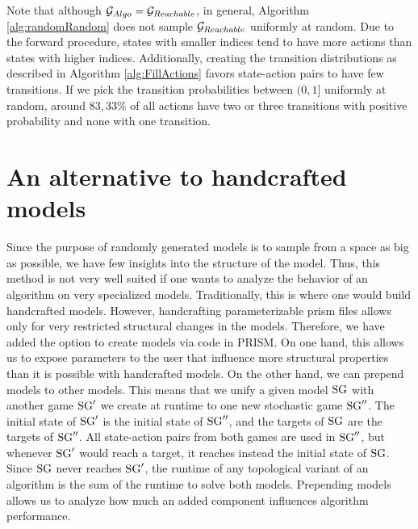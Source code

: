 Note that although $\mathcal{G}_{Algo} = \mathcal{G}_{Reachable}$, in general, Algorithm \ref{alg:randomRandom} does not sample $\mathcal{G}_{Reachable}$ uniformly at random.
Due to the forward procedure, states with smaller indices tend to have more actions than states with higher indices.
Additionally, creating the transition distributions as described in Algorithm \ref{alg:FillActions} favors state-action pairs to have few transitions.
If we pick the transition probabilities between $(0, 1]$ uniformly at random, around $83,33\%$ of all actions have two or three transitions with positive probability and 
none with one transition.

\section{An alternative to handcrafted models} \label{sec:configs}
Since the purpose of randomly generated models is to sample from a space as big as possible, we have few insights into the structure of the model.
Thus, this method is not very well suited if one wants to analyze the behavior of an algorithm on very specialized models. 
Traditionally, this is where one would build handcrafted models. 
However, handcrafting parameterizable prism files allows only for very restricted structural changes in the models. 
Therefore, we have added the option to create models via code in PRISM. 
On one hand, this allows us to expose parameters to the user that influence more structural properties than it is possible with handcrafted models.
On the other hand, we can prepend models to other models.
This means that we unify a given model $\textrm{SG}$ with another game $\textrm{SG}'$ we create at runtime to one new stochastic game $\textrm{SG}''$.
The initial state of $\textrm{SG}'$ is the initial state of $\textrm{SG}''$, and the targets of $\textrm{SG}$ are the targets of $\textrm{SG}''$.
All state-action pairs from both games are used in $\textrm{SG}''$, but whenever $\textrm{SG}'$ would reach a target, it reaches instead the initial state of $\textrm{SG}$.
Since $\textrm{SG}$ never reaches $\textrm{SG}'$, the runtime of any topological variant of an algorithm is the sum of the runtime to solve both models.
Prepending models allows us to analyze how much an added component influences algorithm performance.






